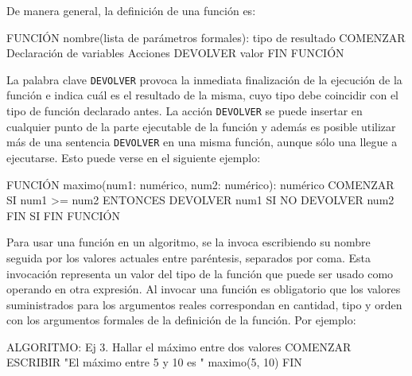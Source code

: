 \documentclass[
]{book}
\newenvironment{Shaded}{\begin{snugshade}}{\end{snugshade}}
\newcommand{\NormalTok}[1]{#1}
\begin{document}
De manera general, la definición de una función es:

\begin{Shaded}
\begin{Highlighting}[]
\NormalTok{FUNCIÓN nombre(lista de parámetros formales): tipo de resultado}
\NormalTok{COMENZAR}
\NormalTok{    Declaración de variables}
\NormalTok{    Acciones}
\NormalTok{    DEVOLVER valor}
\NormalTok{FIN FUNCIÓN}
\end{Highlighting}
\end{Shaded}

La palabra clave \texttt{DEVOLVER} provoca la inmediata finalización de la ejecución de la función e indica cuál es el resultado de la misma, cuyo tipo debe coincidir con el tipo de función declarado antes. La acción \texttt{DEVOLVER} se puede insertar en cualquier punto de la parte ejecutable de la función y además es posible utilizar más de una sentencia \texttt{DEVOLVER} en una misma función, aunque sólo una llegue a ejecutarse. Esto puede verse en el siguiente ejemplo:

\begin{Shaded}
\begin{Highlighting}[]
\NormalTok{FUNCIÓN maximo(num1: numérico, num2: numérico): numérico}
\NormalTok{COMENZAR}
\NormalTok{    SI num1 \textgreater{}= num2}
\NormalTok{        ENTONCES}
\NormalTok{            DEVOLVER num1}
\NormalTok{        SI NO}
\NormalTok{            DEVOLVER num2}
\NormalTok{    FIN SI}
\NormalTok{FIN FUNCIÓN}
\end{Highlighting}
\end{Shaded}

Para usar una función en un algoritmo, se la invoca escribiendo su nombre seguida por los valores actuales entre paréntesis, separados por coma. Esta invocación representa un valor del tipo de la función que puede ser usado como operando en otra expresión. Al invocar una función es obligatorio que los valores suministrados para los argumentos reales correspondan en cantidad, tipo y orden con los argumentos formales de la definición de la función. Por ejemplo:

\begin{Shaded}
\begin{Highlighting}[]
\NormalTok{ALGORITMO: Ej 3. Hallar el máximo entre dos valores}
\NormalTok{COMENZAR}
\NormalTok{    ESCRIBIR "El máximo entre 5 y 10 es " maximo(5, 10)}
\NormalTok{FIN}
\end{Highlighting}
\end{Shaded}
\end{document}
